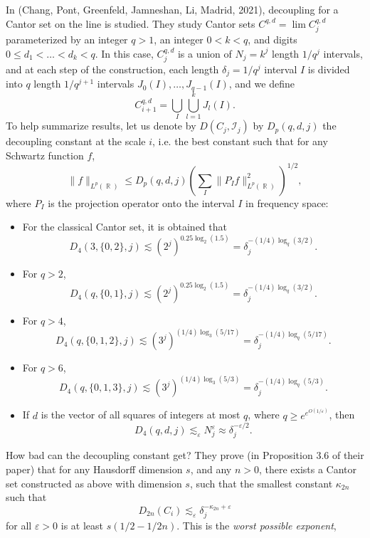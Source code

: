 \documentclass[dvipsnames,letterpaper,12pt]{article}
\numberwithin{equation}{section}
\DeclareMathOperator{\RR}{\mathbb{R}}
\numberwithin{theorem}{section}
\begin{document}
In (Chang, Pont, Greenfeld, Jamneshan, Li, Madrid, 2021), decoupling for a Cantor set on the line is studied. They study Cantor sets $C^{q,d} = \lim C_j^{q,d}$ parameterized by an integer $q > 1$, an integer $0 < k < q$, and digits $0 \leq d_1 < \dots < d_k < q$. In this case, $C^{q,d}_j$ is a union of $N_j = k^j$ length $1/q^j$ intervals, and at each step of the construction, each length $\delta_j = 1/q^j$ interval $I$ is divided into $q$ length $1/q^{j+1}$ intervals $J_0(I),\dots,J_{q-1}(I)$, and we define
%
\[ C^{q,d}_{i+1} = \bigcup_I \bigcup_{l = 1}^k J_l(I). \]
%
To help summarize results, let us denote by $D(C_j, \mathcal{I}_j)$ by $D_p(q,d,j)$ the decoupling constant at the scale $i$, i.e. the best constant such that for any Schwartz function $f$,
%
\[ \| f \|_{L^p(\RR)} \leq D_p(q,d,j) \left( \sum_I \| P_I f \|_{L^p(\RR)}^2 \right)^{1/2}, \]
%
where $P_I$ is the projection operator onto the interval $I$ in frequency space:
%
\begin{itemize}
    \item For the classical Cantor set, it is obtained that
    \[ D_4(3,\{ 0, 2 \}, j) \lesssim (2^j)^{0.25 \log_2(1.5)} = \delta_j^{-(1/4) \log_q(3/2)}. \]

    \item For $q > 2$,
    \[ D_4(q,\{ 0, 1 \}, j) \lesssim (2^j)^{0.25 \log_2(1.5)} = \delta_j^{-(1/4) \log_q(3/2)}. \]

    \item For $q > 4$,
    \[ D_4(q, \{ 0, 1, 2 \}, j) \lesssim (3^j)^{(1/4) \log_3(5/17)} = \delta_j^{-(1/4) \log_q(5/17)}. \]

    \item For $q > 6$,
    \[ D_4(q, \{ 0, 1, 3 \}, j) \lesssim (3^j)^{(1/4) \log_3(5/3)} = \delta_j^{-(1/4) \log_q(5/3)}. \]

    \item If $d$ is the vector of all squares of integers at most $q$, where $q \geq e^{e^{O(1/\varepsilon)}}$, then
    \[ D_4(q,d,j) \lesssim_\varepsilon N_j^\varepsilon \approx \delta_j^{-\varepsilon / 2}. \]
\end{itemize}
%
How bad can the decoupling constant get? They prove (in Proposition 3.6 of their paper) that for any Hausdorff dimension $s$, and any $n > 0$, there exists a Cantor set constructed as above with dimension $s$, such that the smallest constant $\kappa_{2n}$ such that
%
\[ D_{2n}(C_i) \lesssim_\varepsilon \delta_j^{- \kappa_{2n} + \varepsilon} \]
%
for all $\varepsilon > 0$ is at least $s(1/2 - 1/2n)$. This is the \emph{worst possible exponent}, 
\end{document}
